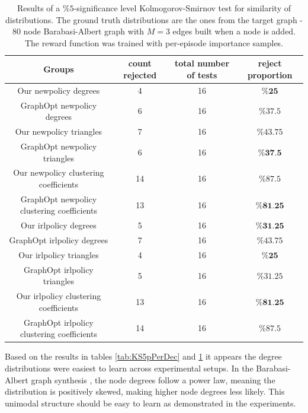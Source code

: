 \documentclass{report}
\numberwithin{equation}{section}
\numberwithin{figure}{section}
\numberwithin{table}{section}
\numberwithin{algorithm}{section}
\begin{document}
\begin{table}[!h]
  \begin{center}
    \caption{\label{tab:KS5pVanilla} 
    Results of a $\%5$-significance level 
    Kolmogorov-Smirnov 
    test for similarity of distributions. 
    The ground truth distributions are the ones 
    from the target graph - 80 node Barabasi-Albert graph 
    with $M=3$ edges built when a node is added. The reward 
    function was trained with per-episode importance samples.}
    \begin{tabular}{|c|c|c|c|}
      \hline
      \textbf{Groups} & \textbf{count rejected} & \textbf{total number of tests} & \textbf{reject proportion}\\
      \hline
      Our newpolicy degrees & 4 & 16 & $\%\textbf{25}$\\
      GraphOpt newpolicy degrees & 6 & 16 & $\%37.5$\\
      \hline
      Our newpolicy triangles & 7 & 16 & $\%43.75$\\
      GraphOpt newpolicy triangles & 6 & 16 & $\%\textbf{37.5}$\\
      \hline
      Our newpolicy clustering coefficients & 14 & 16 & $\%87.5$\\
      GraphOpt newpolicy clustering coefficients & 13 & 16 & $\%\textbf{81.25}$\\
      \hline
      Our irlpolicy degrees & 5 & 16 & $\%\textbf{31.25}$\\
      GraphOpt irlpolicy degrees & 7 & 16 & $\%43.75$\\
      \hline
      Our irlpolicy triangles & 4 & 16 & $\%\textbf{25}$\\
      GraphOpt irlpolicy triangles & 5 & 16 & $\%31.25$\\
      \hline
      Our irlpolicy clustering coefficients & 13 & 16 & $\%\textbf{81.25}$\\
      GraphOpt irlpolicy clustering coefficients & 14 & 16 & $\%87.5$\\
      \hline
    \end{tabular}
  \end{center}
\end{table}

Based on the results in tables \ref{tab:KS5pPerDec} and \ref{tab:KS5pVanilla} 
it appears the degree distributions were easiest to learn 
across experimental setups. In the Barabasi-Albert graph synthesis
\citep{BAGraphs}, 
the node degrees follow a power law, meaning the distribution 
is positively skewed, making higher node degrees less likely. 
This unimodal 
structure should be easy to learn as demonstrated in the experiments.
\end{document}
